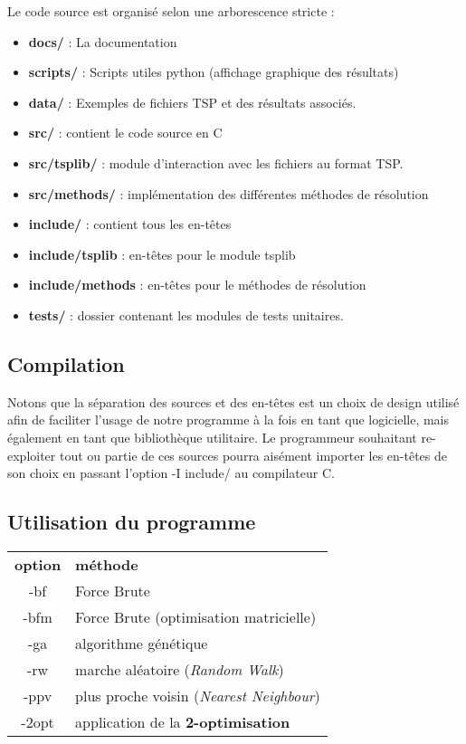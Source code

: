 \documentclass[11pt]{article}
\begin{document}
Le code source est organisé selon une arborescence stricte :

\begin{itemize}
	\item 	\textbf{docs/} : La documentation
	\item 	\textbf{scripts/} : Scripts utiles python (affichage graphique des résultats)
	\item 	\textbf{data/} : Exemples de fichiers TSP et des résultats associés.
    	\item 	\textbf{src/} : contient le code source en C
    \item 	\textbf{src/tsplib/} : module d'interaction avec les fichiers au format TSP.
	\item	\textbf{src/methods/} : implémentation des différentes méthodes de résolution
   	\item 	\textbf{include/} : contient tous les en-têtes
   	\item	\textbf{include/tsplib} : en-têtes pour le module tsplib
	\item 	\textbf{include/methods} : en-têtes pour le méthodes de résolution
    \item 	\textbf{tests/} : dossier contenant les modules de tests unitaires.
\end{itemize}

\subsection*{Compilation}


Notons que la séparation des sources et des en-têtes est un choix de design utilisé afin de faciliter l'usage de notre programme à la fois en tant que logicielle, mais également en tant que bibliothèque utilitaire. Le programmeur souhaitant re-exploiter tout ou partie de ces sources pourra aisément importer les en-têtes de son choix en passant l'option -I include/ au compilateur C.

\subsection*{Utilisation du programme}

\begin{tabular}{ | c | l |}
	\textbf{option}	& \textbf{méthode} \\
	-bf		& Force Brute \\
	-bfm	& Force Brute (optimisation matricielle) \\
	-ga		& algorithme génétique \\
	-rw		& marche aléatoire (\textit{Random Walk}) \\
	-ppv		& plus proche voisin (\textit{Nearest Neighbour}) \\
	-2opt 	& application de la \textbf{2-optimisation} \\
\end{tabular}
\end{document}
